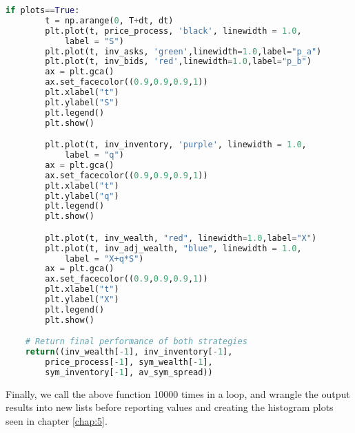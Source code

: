 \begin{lstlisting}[language=Python, caption=Avellaneda-Stoikov Model]
    if plots==True:
        t = np.arange(0, T+dt, dt)
        plt.plot(t, price_process, 'black', linewidth = 1.0, 
            label = "S")
        plt.plot(t, inv_asks, 'green',linewidth=1.0,label="p_a")
        plt.plot(t, inv_bids, 'red',linewidth=1.0,label="p_b")
        ax = plt.gca()
        ax.set_facecolor((0.9,0.9,0.9,1))
        plt.xlabel("t")
        plt.ylabel("S")
        plt.legend()
        plt.show()

        plt.plot(t, inv_inventory, 'purple', linewidth = 1.0, 
            label = "q")
        ax = plt.gca()
        ax.set_facecolor((0.9,0.9,0.9,1))
        plt.xlabel("t")
        plt.ylabel("q")
        plt.legend()
        plt.show()

        plt.plot(t, inv_wealth, "red", linewidth=1.0,label="X")
        plt.plot(t, inv_adj_wealth, "blue", linewidth = 1.0, 
            label = "X+q*S")
        ax = plt.gca()
        ax.set_facecolor((0.9,0.9,0.9,1))
        plt.xlabel("t")
        plt.ylabel("X")
        plt.legend()
        plt.show()

    # Return final performance of both strategies
    return((inv_wealth[-1], inv_inventory[-1], 
        price_process[-1], sym_wealth[-1], 
        sym_inventory[-1], av_sym_spread))
\end{lstlisting}

Finally, we call the above function 10000 times in a loop, and wrangle the output 
results into new lists before reporting values and creating the histogram plots 
seen in chapter \ref{chap:5}.

